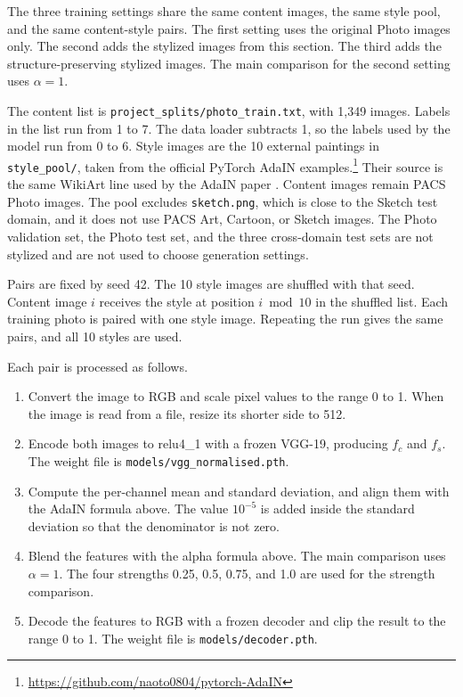 \documentclass[a4paper]{article}
\begin{document}
The three training settings share the same content images, the same style pool, and the same content-style pairs. The first setting uses the original Photo images only. The second adds the stylized images from this section. The third adds the structure-preserving stylized images. The main comparison for the second setting uses $\alpha=1$.

The content list is \texttt{project\_splits/photo\_train.txt}, with 1,349 images. Labels in the list run from 1 to 7. The data loader subtracts 1, so the labels used by the model run from 0 to 6. Style images are the 10 external paintings in \texttt{style\_pool/}, taken from the official PyTorch AdaIN examples.\footnote{\url{https://github.com/naoto0804/pytorch-AdaIN}} Their source is the same WikiArt line used by the AdaIN paper \cite{huang2017adain}. Content images remain PACS Photo images. The pool excludes \texttt{sketch.png}, which is close to the Sketch test domain, and it does not use PACS Art, Cartoon, or Sketch images. The Photo validation set, the Photo test set, and the three cross-domain test sets are not stylized and are not used to choose generation settings.

Pairs are fixed by seed 42. The 10 style images are shuffled with that seed. Content image $i$ receives the style at position $i \bmod 10$ in the shuffled list. Each training photo is paired with one style image. Repeating the run gives the same pairs, and all 10 styles are used.

Each pair is processed as follows.
\begin{enumerate}
  \item Convert the image to RGB and scale pixel values to the range 0 to 1. When the image is read from a file, resize its shorter side to 512.
  \item Encode both images to relu4\_1 with a frozen VGG-19, producing $f_c$ and $f_s$. The weight file is \texttt{models/vgg\_normalised.pth}.
  \item Compute the per-channel mean and standard deviation, and align them with the AdaIN formula above. The value $10^{-5}$ is added inside the standard deviation so that the denominator is not zero.
  \item Blend the features with the alpha formula above. The main comparison uses $\alpha=1$. The four strengths 0.25, 0.5, 0.75, and 1.0 are used for the strength comparison.
  \item Decode the features to RGB with a frozen decoder and clip the result to the range 0 to 1. The weight file is \texttt{models/decoder.pth}.
\end{enumerate}
\end{document}
